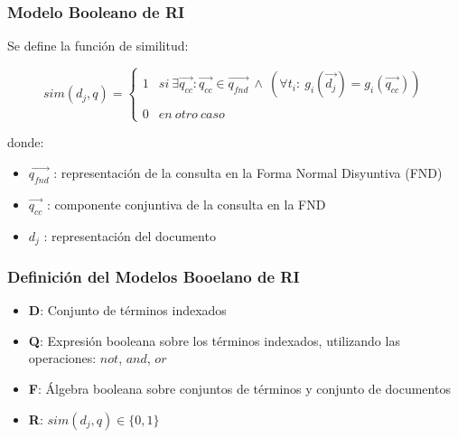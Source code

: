 \documentclass[
10pt, %
aspectratio=169, %
]{beamer}
\begin{document}
	\begin{frame}
		
		\frametitle{Modelo Booleano de RI}
		 
		 Se define la función de similitud: 
		 
		 	$$sim(d_j, q) = 
		 		\left\{
		 			\begin{array}{ll} 
		 				1 & si \ \exists \overrightarrow{q_{cc}} : \overrightarrow{q_{cc}} \in \overrightarrow{q_{fnd}} \ \wedge \ (\forall t_i :\  g_i(\overrightarrow{d_j}) = g_i(\overrightarrow{q_{cc}}))\\ \\
		 				0 & en \ otro \ caso
		 			\end{array} 
		 		\right.
		 	$$
		 	
		 	donde:
		 	\begin{itemize}
		 		\item $\overrightarrow{q_{fnd}}$ : representación de la consulta en la Forma Normal Disyuntiva (FND)
		 		
		 		\item $\overrightarrow{q_{cc}}$ : componente conjuntiva de la consulta en la FND
		 		
		 		\item $d_j$ : representación del documento
		 		
		 	\end{itemize}
		 	
		
	\end{frame}
	
	\begin{frame}
		
		\frametitle{Definición del Modelos Booelano de RI}
		
		\begin{itemize}
			
			\item[] \textbf{D}: Conjunto de términos indexados \\[2mm]
			
			\item[] \textbf{Q}: Expresión booleana sobre los términos indexados, utilizando las operaciones: $not$, $and$, $or$ \\[2mm]
			
			\item[] \textbf{F}: Álgebra booleana sobre conjuntos de términos y conjunto de documentos \\[2mm]
			
			\item[] \textbf{R}: $sim(d_j, q) \in \{0, 1\}$ \\[2mm]

		\end{itemize}
		
	\end{frame}
	
\end{document}
